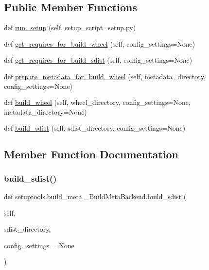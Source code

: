 \subsection*{Public Member Functions}
\begin{DoxyCompactItemize}
\item 
def \hyperlink{classsetuptools_1_1build__meta_1_1__BuildMetaBackend_a53ec68b77c60e1208e2413bde8361d9f}{run\+\_\+setup} (self, setup\+\_\+script=\textquotesingle{}setup.\+py\textquotesingle{})
\item 
def \hyperlink{classsetuptools_1_1build__meta_1_1__BuildMetaBackend_a955e0ef5aa11e7b7eb4088d57398505d}{get\+\_\+requires\+\_\+for\+\_\+build\+\_\+wheel} (self, config\+\_\+settings=None)
\item 
def \hyperlink{classsetuptools_1_1build__meta_1_1__BuildMetaBackend_a24f84b6c544182a66cd7e7a79caadb32}{get\+\_\+requires\+\_\+for\+\_\+build\+\_\+sdist} (self, config\+\_\+settings=None)
\item 
def \hyperlink{classsetuptools_1_1build__meta_1_1__BuildMetaBackend_a71eff64cdfe377b4a9efe369cb88585e}{prepare\+\_\+metadata\+\_\+for\+\_\+build\+\_\+wheel} (self, metadata\+\_\+directory, config\+\_\+settings=None)
\item 
def \hyperlink{classsetuptools_1_1build__meta_1_1__BuildMetaBackend_a949bcef95ce98b8bdfbee3d7125ca448}{build\+\_\+wheel} (self, wheel\+\_\+directory, config\+\_\+settings=None, metadata\+\_\+directory=None)
\item 
def \hyperlink{classsetuptools_1_1build__meta_1_1__BuildMetaBackend_a9bfb4cc63cadfc5ec9b092941c8e228b}{build\+\_\+sdist} (self, sdist\+\_\+directory, config\+\_\+settings=None)
\end{DoxyCompactItemize}


\subsection{Member Function Documentation}
\mbox{\label{classsetuptools_1_1build__meta_1_1__BuildMetaBackend_a9bfb4cc63cadfc5ec9b092941c8e228b}} 
\subsubsection{\texorpdfstring{build\+\_\+sdist()}{build\_sdist()}}
{\footnotesize\ttfamily def setuptools.\+build\+\_\+meta.\+\_\+\+Build\+Meta\+Backend.\+build\+\_\+sdist (\begin{DoxyParamCaption}\item[{}]{self,  }\item[{}]{sdist\+\_\+directory,  }\item[{}]{config\+\_\+settings = {\ttfamily None} }\end{DoxyParamCaption})}

